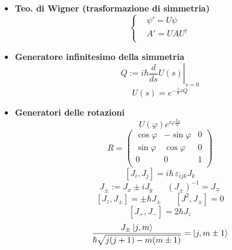 \documentclass{article}
\DeclarePairedDelimiter\ket{\lvert}{\rangle}
\begin{document}
\begin{small}
\begin{multicols*}{3}
\begin{itemize}[leftmargin=*]
	\item \textbf{Teo. di Wigner (trasformazione di simmetria)}
		\[
			\left\{\begin{aligned}
				&\psi ' = U\psi \\
				&A' = UAU^\dag \\
			\end{aligned}\right.
		\]
	\item \textbf{Generatore infinitesimo della simmetria}
		\[Q:= \left.i\hbar \frac{d}{ds}U(s)\right|_{s=0}\]
		\[U(s) = e^{-\frac{i}{\hbar }sQ}\]
	\item \textbf{Generatori delle rotazioni}
		\[U(\varphi ) e^{i\varphi \frac{L_3}{\mathbb{h}}}\]
		\[R=\begin{pmatrix}
			\cos\varphi & -\sin\varphi &0\\
			\sin\varphi &\cos\varphi & 0\\
			0&0&1\\
		\end{pmatrix}\]
		\[\left[J_i, J_j\right] = i\hbar\, \varepsilon _{ijk} J_k\]
		\[J_\pm := J_x \pm iJ_y%
		\hspace{20pt} \left(J_\pm\right)^{-1} = J_\mp\]
		\[\left[J_z,J_\pm\right] = \pm\hbar J_\pm \hspace{20pt} \left[J^2,J_\pm\right] = 0\]
		\[\left[J_+, J_-\right] = 2\hbar J_z\]
		\[\frac{J_\pm \, \ket*{j,m}}{\hbar \sqrt{j(j+1) - m(m\pm 1)}} = \ket*{j,m\pm 1}\]


\end{itemize}
\end{multicols*}
\end{small}
\end{document}

